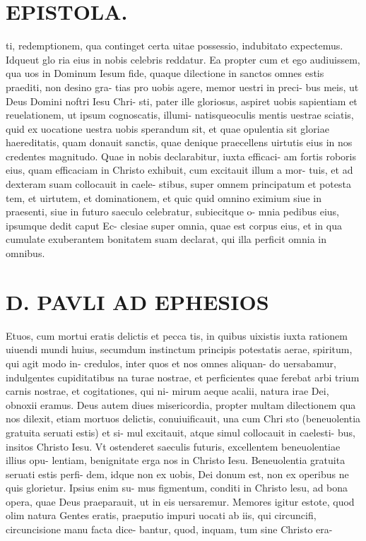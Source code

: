 \documentclass{article}
\begin{document}
\begin{pages}
\section*{EPISTOLA. }
\marginpar{[ p.90 ]}
\marginpar{[ p.91 ]}
\marginpar{[ p.92 ]}\pstart ti, redemptionem, qua continget certa uitae possessio, indubitato expectemus. Idqueut glo ria eius in nobis celebris reddatur.  \pend\pstart Ea propter cum et ego audiuissem, qua uos in Dominum Iesum fide, quaque dilectione in sanctos omnes estis praediti, non desino gra- tias pro uobis agere, memor uestri in preci- bus meis, ut Deus Domini noftri Iesu Chri- sti, pater ille gloriosus, aspiret uobis sapientiam et reuelationem, ut ipsum cognoscatis, illumi- natisqueoculis mentis uestrae sciatis, quid ex uocatione uestra uobis sperandum sit, et quae opulentia sit gloriae haereditatis, quam donauit sanctis, quae denique praecellens uirtutis eius in nos credentes magnitudo.  \pend\pstart Quae in nobis declarabitur, iuxta efficaci- am fortis roboris eius, quam efficaciam in Christo exhibuit, cum excitauit illum a mor- tuis, et ad dexteram suam collocauit in caele- stibus, super omnem principatum et potesta tem, et uirtutem, et dominationem, et quic quid omnino eximium siue in praesenti, siue in futuro saeculo celebratur, subiecitque o- mnia pedibus eius, ipsumque dedit caput Ec- clesiae super omnia, quae est corpus eius, et in qua cumulate exuberantem bonitatem suam declarat, qui illa perficit omnia in omnibus.  \pend
\section*{D. PAVLI AD EPHESIOS }
\marginpar{[ p.1. ]}
\marginpar{[ p.2. ]}
\marginpar{[ p.3. ]}
\marginpar{[ p.4. ]}\pstart Etuos, cum mortui eratis delictis et pecca tis, in quibus uixistis iuxta rationem uiuendi mundi huius, secumdum instinctum principis potestatis aerae, spiritum, qui agit modo in- credulos, inter quos et nos omnes aliquan- do uersabamur, indulgentes cupiditatibus na turae nostrae, et perficientes quae ferebat arbi trium carnis nostrae, et cogitationes, qui ni- mirum aeque acalii, natura irae Dei, obnoxii eramus.  \pend\pstart Deus autem diues misericordia, propter multam dilectionem qua nos dilexit, etiam mortuos delictis, conuiuificauit, una cum Chri sto (beneuolentia gratuita seruati estis) et si- mul excitauit, atque simul collocauit in caelesti- bus, insitos Christo Iesu. Vt ostenderet saeculis futuris, excellentem beneuolentiae illius opu- lentiam, benignitate erga nos in Christo Iesu.  \pend\pstart Beneuolentia gratuita seruati estis perfi- dem, idque non ex uobis, Dei donum est, non ex operibus ne quis glorietur. Ipsius enim su- mus figmentum, conditi in Christo lesu, ad bona opera, quae Deus praeparauit, ut in eis uersaremur.  \pend\pstart Memores igitur estote, quod olim natura Gentes eratis, praeputio impuri uocati ab iis, qui circuncifi, circuncisione manu facta dice- bantur, quod, inquam, tum sine Christo era-  \pend

\end{pages}
\end{document}
